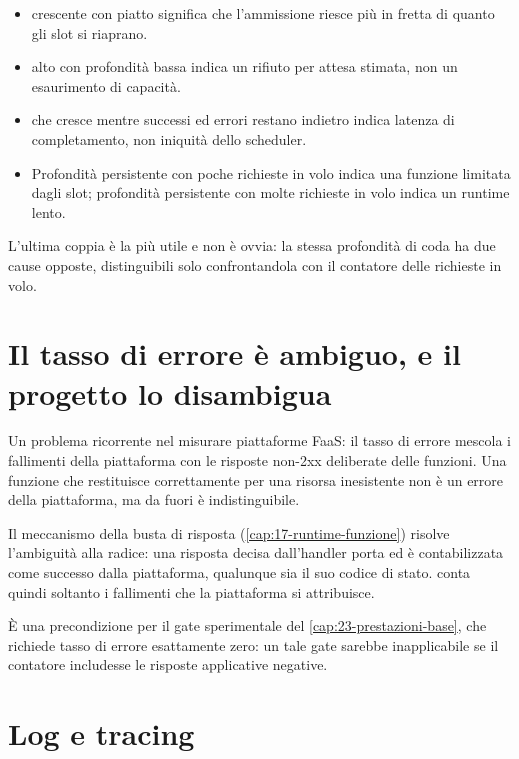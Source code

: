 \begin{itemize}[leftmargin=*]
  \item {} crescente con 
  piatto significa che l'ammissione riesce pi\`u in fretta di quanto gli slot si
  riaprano.
  \item {} alto con profondit\`a bassa indica un
  rifiuto per attesa stimata, non un esaurimento di capacit\`a.
  \item {} che cresce mentre successi ed errori
  restano indietro indica latenza di completamento, non iniquit\`a dello
  scheduler.
  \item Profondit\`a persistente con poche richieste in volo indica una funzione
  limitata dagli slot; profondit\`a persistente con molte richieste in volo
  indica un runtime lento.
\end{itemize}

L'ultima coppia \`e la pi\`u utile e non \`e ovvia: la stessa profondit\`a di coda
ha due cause opposte, distinguibili solo confrontandola con il contatore delle
richieste in volo.

\section{Il tasso di errore \`e ambiguo, e il progetto lo disambigua}

Un problema ricorrente nel misurare piattaforme FaaS: il tasso di errore
mescola i fallimenti della piattaforma con le risposte non-2xx deliberate delle
funzioni. Una funzione che restituisce correttamente  per una risorsa
inesistente non \`e un errore della piattaforma, ma da fuori \`e indistinguibile.

Il meccanismo della busta di risposta (\cref{cap:17-runtime-funzione}) risolve
l'ambiguit\`a alla radice: una risposta decisa dall'handler porta
 ed \`e contabilizzata come successo dalla
piattaforma, qualunque sia il suo codice di stato. 
conta quindi soltanto i fallimenti che la piattaforma si attribuisce.

\`E una precondizione per il gate sperimentale del
\cref{cap:23-prestazioni-base}, che richiede tasso di errore esattamente zero:
un tale gate sarebbe inapplicabile se il contatore includesse le risposte
applicative negative.

\section{Log e tracing}

